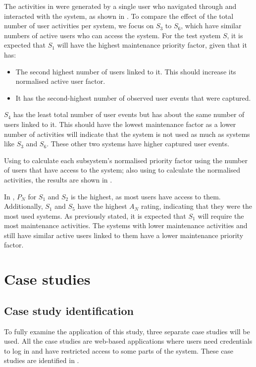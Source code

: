 The activities in  were generated by a single user who navigated through and interacted with the system, as shown in . To compare the effect of the total number of user activities per system, we focus on $S_3$ to $S_6$, which have similar numbers of active users who can access the system. For the test system $S$, it is expected that $S_1$ will have the highest maintenance priority factor, given that it has:

\begin{itemize}
	\item The second highest number of users linked to it. This should increase its normalised active user factor.
	\item It has the second-highest number of observed user events that were captured.
\end{itemize}

$S_4$ has the least total number of user events but has about the same number of users linked to it. This should have the lowest maintenance factor as a lower number of activities will indicate that the system is not used as much as systems like $S_3$ and $S_6$. These other two systems have higher captured user events.\par Using  to calculate each subsystem's normalised priority factor using the number of users that have access to the system; also using  to calculate the normalised activities, the results are shown in .



In , $P_N$ for $S_1$ and $S_2$ is the highest, as most users have access to them. Additionally, $S_1$ and $S_5$ have the highest $A_N$ rating, indicating that they were the most used systems. As previously stated, it is expected that $S_1$ will require the most maintenance activities. The systems with lower maintenance activities and still have similar active users linked to them have a lower maintenance priority factor.

\clearpage

\section{Case studies}

\subsection{Case study identification}
To fully examine the application of this study, three separate case studies will be used. All the case studies are web-based applications where users need credentials to log in and have restricted access to some parts of the system. These case studies are identified in .

